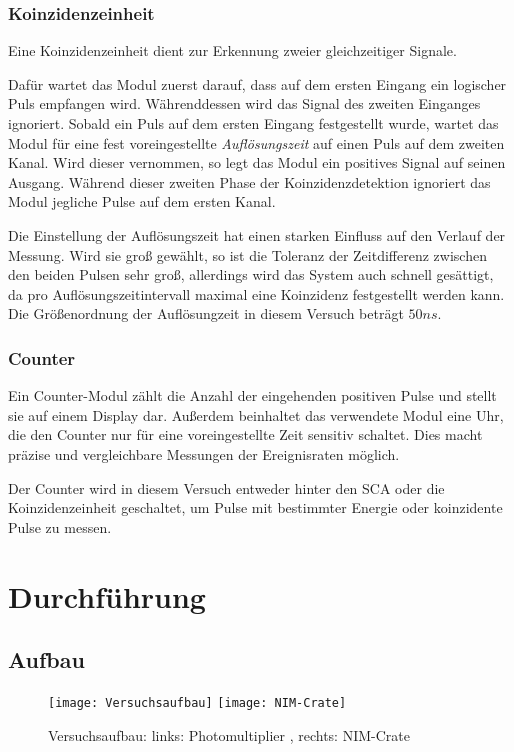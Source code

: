 \documentclass{../Misc/MontavonLaTeX/Montavon}
\newcommand{\halfwidth}{0.48\textwidth}
\begin{document}
\subsubsection{Koinzidenzeinheit}
Eine Koinzidenzeinheit dient zur Erkennung zweier gleichzeitiger Signale. 

Dafür wartet das Modul zuerst darauf, dass auf dem ersten Eingang ein logischer Puls empfangen wird. Währenddessen wird das Signal des zweiten Einganges ignoriert.
Sobald ein Puls auf dem ersten Eingang festgestellt wurde, wartet das Modul für eine fest voreingestellte \emph{Auflösungszeit} auf einen Puls auf dem zweiten Kanal. Wird dieser vernommen, so legt das Modul ein positives Signal auf seinen Ausgang. 
Während dieser zweiten Phase der Koinzidenzdetektion ignoriert das Modul jegliche Pulse auf dem ersten Kanal.

Die Einstellung der Auflösungszeit hat einen starken Einfluss auf den Verlauf der Messung. Wird sie groß gewählt, so ist die Toleranz der Zeitdifferenz zwischen den beiden Pulsen sehr groß, allerdings wird das System auch schnell gesättigt, da pro Auflösungszeitintervall maximal eine Koinzidenz festgestellt werden kann. Die Größenordnung der Auflösungzeit in diesem Versuch beträgt $50 \unit{ns}$.

\subsubsection{Counter}
Ein Counter-Modul zählt die Anzahl der eingehenden positiven Pulse und stellt sie auf einem Display dar. Außerdem beinhaltet das verwendete Modul eine Uhr, die den Counter nur für eine voreingestellte Zeit sensitiv schaltet. Dies macht präzise und vergleichbare Messungen der Ereignisraten möglich.

Der Counter wird in diesem Versuch entweder hinter den SCA oder die Koinzidenzeinheit geschaltet, um Pulse mit bestimmter Energie oder koinzidente Pulse zu messen. 

\section{Durchführung}

\subsection{Aufbau}

\begin{figure}[htbp]
\centering
\texttt{[image: Versuchsaufbau]}
\texttt{[image: NIM-Crate]}
\caption{Versuchsaufbau: links: Photomultiplier , rechts: NIM-Crate}
\label{fig:Aufbau}
\end{figure}
\end{document}
